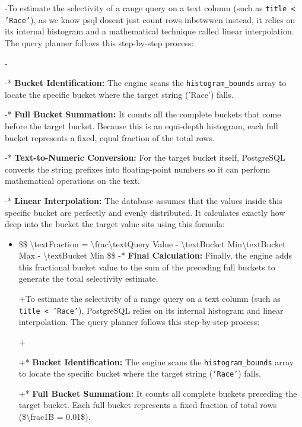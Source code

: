 \documentclass[11pt,a4paper]{article}
\begin{document}
{-To estimate the selectivity of a range query on a text column (such as \texttt{title < 'Race'}), as we know psql dosent just count rows inbetwwen instead, it relies on its internal histogram and a mathematical technique called linear interpolation. The query planner follows this step-by-step process:

-

-*   \textbf{Bucket Identification:} The engine scans the \texttt{histogram\_bounds} array to locate the specific bucket where the target string ('Race') falls.

-*   \textbf{Full Bucket Summation:} It counts all the complete buckets that come before the target bucket. Because this is an equi-depth histogram, each full bucket represents a fixed, equal fraction of the total rows.

-*   \textbf{Text-to-Numeric Conversion:} For the target bucket itself, PostgreSQL converts the string prefixes into floating-point numbers so it can perform mathematical operations on the text.

-*   \textbf{Linear Interpolation:} The database assumes that the values inside this specific bucket are perfectly and evenly distributed. It calculates exactly how deep into the bucket the target value sits using this formula:

\begin{itemize}
\item    \$\$ \textbackslash{}text{Fraction} = \textbackslash{}frac{\textbackslash{}text{Query Value} - \textbackslash{}text{Bucket Min}}{\textbackslash{}text{Bucket Max} - \textbackslash{}text{Bucket Min}} \$\$
-*   \textbf{Final Calculation:} Finally, the engine adds this fractional bucket value to the sum of the preceding full buckets to generate the total selectivity estimate.

+To estimate the selectivity of a range query on a text column (such as \texttt{title < 'Race'}), PostgreSQL relies on its internal histogram and linear interpolation. The query planner follows this step-by-step process:

+

+*   \textbf{Bucket Identification:} The engine scans the \texttt{histogram\_bounds} array to locate the specific bucket where the target string (\texttt{'Race'}) falls.

+*   \textbf{Full Bucket Summation:} It counts all complete buckets preceding the target bucket. Each full bucket represents a fixed fraction of total rows (\$\textbackslash{}frac{1}{B} = 0.01\$).


\end{itemize}}
\end{document}
